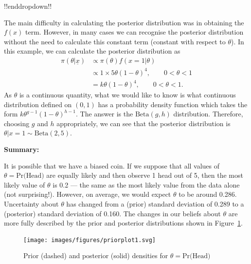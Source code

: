 {!!enddropdown!!











The main difficulty in calculating the posterior distribution was in obtaining the $f(x)$ term. However, in many cases we can recognise the posterior distribution without the need to calculate this constant term (constant with respect to $\theta$). In this example, we can calculate the posterior distribution as
\begin{align*}
\pi(\theta|\underline{x})&\propto\pi(\theta)f(x=1|\theta) \\
&\propto 1\times 5\theta(1-\theta)^4,\quad\quad 0<\theta<1  \\
&=k\theta(1-\theta)^4,\quad\quad 0<\theta<1.
\end{align*}
As $\theta$ is a continuous quantity, what we would like to know is what continuous distribution defined on $(0,1)$ has a probability density function which takes the form $k\theta^{g-1}(1-\theta)^{h-1}$. The answer is the $\mathrm{Beta}(g,h)$ distribution. Therefore, choosing $g$ and $h$ appropriately, we can see that the posterior distribution is $\theta|x=1\sim \mathrm{Beta}(2,5)$.

\textbf{Summary:}

It is possible that we have a biased coin. If we suppose that all values of $\theta=\text{Pr(Head)}$ are equally likely and then observe 1 head out of 5, then the most likely value of $\theta$ is 0.2 --- the same as the most likely value from the data alone (not surprising!). However, on average, we would expect $\theta$ to be around 0.286. Uncertainty about $\theta$ has changed from a (prior) standard deviation of 0.289 to a (posterior) standard deviation of 0.160. The changes in our beliefs about $\theta$ are more fully described by the prior and posterior distributions shown in Figure~\ref{fig:betaplot2}.
\begin{figure}[ht]

\texttt{[image: images/figures/priorplot1.svg]}
\caption{Prior (dashed) and posterior (solid) densities for $\theta=\text{Pr(Head)}$}
\label{fig:betaplot2}

\end{figure}}

